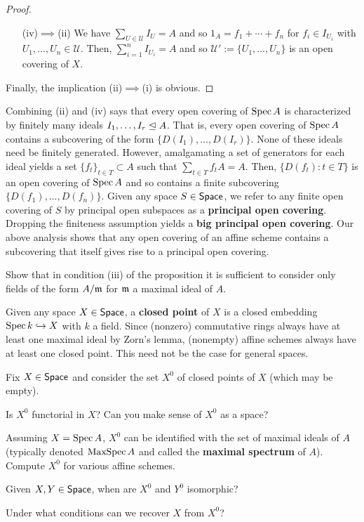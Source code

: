 \documentclass[11pt]{article}
\newcommand{\U}{\mathscr{U}}
\begin{document}
\begin{proof}
\begin{enumerate}
\item[(iv)$\implies$(ii)] We have $\sum_{U\in\U}I_U=A$ and so $1_A=f_1+\cdots+f_n$ for $f_i\in I_{U_i}$ with $U_1,\ldots,U_n\in\U$. Then, $\sum_{i=1}^nI_{U_i}=A$ and so $\U':=\{U_1,\ldots,U_n\}$ is an open covering of $X$.
\end{enumerate}
Finally, the implication (ii)$\implies$(i) is obvious.
\end{proof}

Combining (ii) and (iv) says that every open covering of $\operatorname{Spec} A$ is characterized by finitely many ideals $I_1,\ldots,I_r\trianglelefteq A$. That is, every open covering of $\operatorname{Spec} A$ contains a subcovering of the form $\{D(I_1),\ldots,D(I_r)\}$. None of these ideals need be finitely generated. However, amalgamating a set of generators for each ideal yields a set $\{f_t\}_{t\in T}\subset A$ such that $\sum_{t\in T}f_tA=A$. Then, $\{D(f_t) : t\in T\}$ is an open covering of $\operatorname{Spec} A$ and so contains a finite subcovering $\{D(f_1),\ldots,D(f_n)\}$. Given any space $S\in\operatorname{\mathsf{Space}}$, we refer to any finite open covering of $S$ by principal open subspaces as a \textbf{principal open covering}. Dropping the finiteness assumption yields a \textbf{big principal open covering}. Our above analysis shows that any open covering of an affine scheme contains a subcovering that itself gives rise to a principal open covering.

\begin{exercise}
Show that in condition \textup{(iii)} of the proposition it is sufficient to consider only fields of the form $A/\mathfrak{m}$ for $\mathfrak{m}$ a maximal ideal of $A$.
\end{exercise}

Given any space $X\in\operatorname{\mathsf{Space}}$, a \textbf{closed point} of $X$ is a closed embedding $\operatorname{Spec} k\hookrightarrow X$ with $k$ a field. Since (nonzero) commutative rings always have at least one maximal ideal by Zorn's lemma, (nonempty) affine schemes always have at least one closed point. This need not be the case for general spaces.

\begin{exercise}
Fix $X\in\operatorname{\mathsf{Space}}$ and consider the set $X^0$ of closed points of $X$ (which may be empty).
\begin{enum}{\arabic}
\item Is $X^0$ functorial in $X$? Can you make sense of $X^0$ as a space?

\item Assuming $X=\operatorname{Spec} A$, $X^0$ can be identified with the set of maximal ideals of $A$ (typically denoted $\operatorname{MaxSpec} A$ and called the \textbf{maximal spectrum} of $A$). Compute $X^0$ for various affine schemes.

\item Given $X,Y\in\operatorname{\mathsf{Space}}$, when are $X^0$ and $Y^0$ isomorphic?

\item Under what conditions can we recover $X$ from $X^0$? 
\end{enum}
\end{exercise}
\end{document}
